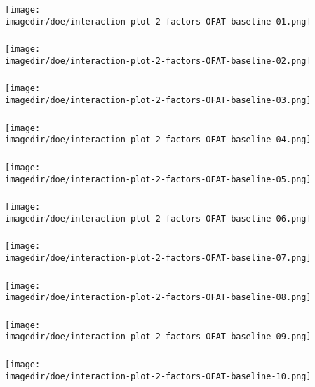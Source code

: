 \documentclass[11pt,aspectratio=169,mathserif]{beamer}
\begin{document}
\begin{frame}\frametitle{}
	\centerline{\texttt{[image: \\imagedir/doe/interaction-plot-2-factors-OFAT-baseline-01.png]}}
\end{frame}
\begin{frame}\frametitle{}
	\centerline{\texttt{[image: \\imagedir/doe/interaction-plot-2-factors-OFAT-baseline-02.png]}}
\end{frame}
\begin{frame}\frametitle{}
	\centerline{\texttt{[image: \\imagedir/doe/interaction-plot-2-factors-OFAT-baseline-03.png]}}
\end{frame}
\begin{frame}\frametitle{}
	\centerline{\texttt{[image: \\imagedir/doe/interaction-plot-2-factors-OFAT-baseline-04.png]}}
\end{frame}
\begin{frame}\frametitle{}
	\centerline{\texttt{[image: \\imagedir/doe/interaction-plot-2-factors-OFAT-baseline-05.png]}}
\end{frame}
\begin{frame}\frametitle{}
	\centerline{\texttt{[image: \\imagedir/doe/interaction-plot-2-factors-OFAT-baseline-06.png]}}
\end{frame}
\begin{frame}\frametitle{}
	\centerline{\texttt{[image: \\imagedir/doe/interaction-plot-2-factors-OFAT-baseline-07.png]}}
\end{frame}
\begin{frame}\frametitle{}
	\centerline{\texttt{[image: \\imagedir/doe/interaction-plot-2-factors-OFAT-baseline-08.png]}}
\end{frame}
\begin{frame}\frametitle{}
	\centerline{\texttt{[image: \\imagedir/doe/interaction-plot-2-factors-OFAT-baseline-09.png]}}
\end{frame}
\begin{frame}\frametitle{}
	\centerline{\texttt{[image: \\imagedir/doe/interaction-plot-2-factors-OFAT-baseline-10.png]}}
\end{frame}
\end{document}
